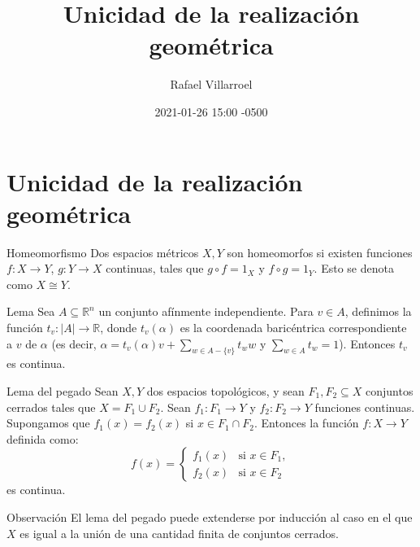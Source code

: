 \documentclass[spanish, presentation]{beamer}
\author{Rafael Villarroel}
\date{2021-01-26 15:00 -0500}
\title{Unicidad de la realización geométrica}
\begin{document}
\maketitle
{}

\section{Unicidad de la realización geométrica}
\label{sec:orgdbcb520}

\begin{frame}[label={sec:org121f0b2}]{Homeomorfismo}
Dos espacios métricos \(X,Y\) son \alert{homeomorfos}  si existen funciones \(f\colon X\to Y\), \(g\colon Y\to X\) continuas, tales que \(g\circ f=1_{X}\) y \(f\circ g=1_{Y}\). Esto se denota como \(X\cong Y\).
\end{frame}

\begin{frame}[label=1.2]{Lema}
Sea \(A\subseteq \mathbb{R}^{n}\) un conjunto afínmente independiente. Para \(v\in A\), definimos la función \(t_{v}\colon |A|\to \mathbb{R}\), donde \(t_{v}(\alpha)\) es la coordenada baricéntrica correspondiente a \(v\) de \(\alpha\) (es decir, \(\alpha=t_{v}(\alpha)v+\sum_{w\in A-\{v\}} t_{w}w\) y \(\sum_{w\in A}t_{w}=1\)). Entonces \(t_{v}\) es continua.
\end{frame}

\begin{frame}[label={sec:org8c346c3}]{Lema del pegado}
Sean \(X, Y\) dos espacios topológicos, y sean \(F_{1},F_{2}\subseteq X\) conjuntos cerrados tales que \(X=F_{1}\cup F_{2}\). Sean \(f_{1}\colon F_{1}\to Y\) y \(f_{2}\colon F_{2}\to Y\) funciones continuas. Supongamos que \(f_{1}(x)=f_{2}(x)\) si \(x\in F_{1}\cap F_{2}\). Entonces la función \(f\colon X\to Y\) definida como:
\begin{equation}
\label{eq:1}
f(x)=
\begin{cases}
f_{1}(x) & \text{si \(x\in F_{1}\)},\\
f_{2}(x) & \text{si \(x\in F_{2}\)}
\end{cases}
\end{equation}
es continua.
\end{frame}

\begin{frame}[label={sec:org4adee54}]{Observación}
El lema del pegado puede extenderse por inducción al caso en el que \(X\) es igual a la unión de una cantidad finita de conjuntos cerrados.
\end{frame}
\end{document}
